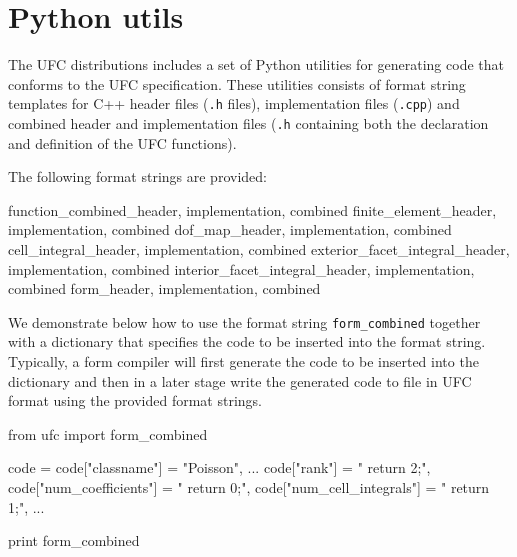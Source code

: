 \chapter{Python utils}

The UFC distributions includes a set of Python utilities for
generating code that conforms to the UFC specification. These
utilities consists of format string templates for C++ header files
(\texttt{.h} files), implementation files (\texttt{.cpp}) and combined
header and implementation files (\texttt{.h} containing both the
declaration and definition of the UFC functions).

The following format strings are provided:

\begin{code}
function_combined_{header, implementation, combined}
finite_element_{header, implementation, combined}
dof_map_{header, implementation, combined}
cell_integral_{header, implementation, combined}
exterior_facet_integral_{header, implementation, combined}
interior_facet_integral_{header, implementation, combined}
form_{header, implementation, combined}
\end{code}

We demonstrate below how to use the format string
\texttt{form\_combined} together with a dictionary that specifies the
code to be inserted into the format string. Typically, a form compiler
will first generate the code to be inserted into the dictionary and
then in a later stage write the generated code to file in UFC format
using the provided format strings.

\begin{code}
from ufc import form_combined

code = {}
code["classname"] = "Poisson",
...
code["rank"] = "    return 2;",
code["num_coefficients"] = "    return 0;",
code["num_cell_integrals"] = "    return 1;",
...

print form_combined %
\end{code}
